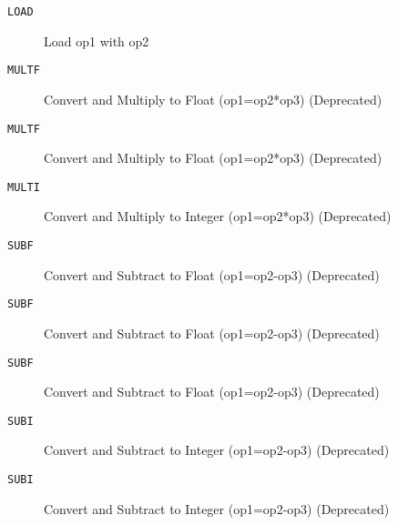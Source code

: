 \begin{description}
\item[\texttt{LOAD}]  Load op1 with op2\\

\end{description}
\begin{description}
\item[\texttt{MULTF}]  Convert and Multiply to Float (op1=op2*op3) (Deprecated)\\

\end{description}
\begin{description}
\item[\texttt{MULTF}]  Convert and Multiply to Float (op1=op2*op3) (Deprecated)\\

\end{description}
\begin{description}
\item[\texttt{MULTI}]  Convert and Multiply to Integer (op1=op2*op3) (Deprecated)\\

\end{description}
\begin{description}
\item[\texttt{SUBF}]  Convert and Subtract to Float (op1=op2-op3) (Deprecated)\\

\end{description}
\begin{description}
\item[\texttt{SUBF}]  Convert and Subtract to Float (op1=op2-op3) (Deprecated)\\

\end{description}
\begin{description}
\item[\texttt{SUBF}]  Convert and Subtract to Float (op1=op2-op3) (Deprecated)\\

\end{description}
\begin{description}
\item[\texttt{SUBI}]  Convert and Subtract to Integer (op1=op2-op3) (Deprecated)\\

\end{description}
\begin{description}
\item[\texttt{SUBI}]  Convert and Subtract to Integer (op1=op2-op3) (Deprecated)\\

\end{description}
